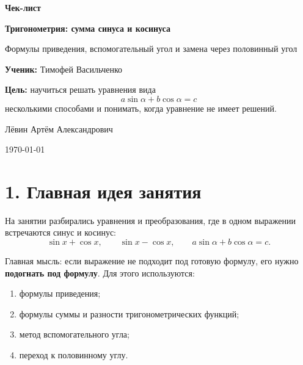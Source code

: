 \documentclass[a4paper,12pt]{article}
\newcommand{\important}[1]{\textcolor{darkaccent}{\textbf{#1}}}
\begin{document}
\begin{titlepage}
\thispagestyle{empty}

\vspace*{18mm}

{\Huge\bfseries\textcolor{darkaccent}{Чек-лист}}

\vspace{8mm}

{\Large\bfseries Тригонометрия: сумма синуса и косинуса}

\vspace{4mm}

{\large Формулы приведения, вспомогательный угол и замена через половинный угол}

\vspace{18mm}

\textbf{Ученик:} Тимофей Васильченко

\vspace{7mm}

\textbf{Цель:} научиться решать уравнения вида
\[
a\sin\alpha+b\cos\alpha=c
\]
несколькими способами и понимать, когда уравнение не имеет решений.

\vfill

{\large Лёвин Артём Александрович}

\vspace{4mm}

{\large \today}

\end{titlepage}

\section*{1. Главная идея занятия}

На занятии разбирались уравнения и преобразования, где в одном выражении встречаются синус и косинус:
\[
\sin x+\cos x,\qquad \sin x-\cos x,\qquad a\sin\alpha+b\cos\alpha=c.
\]

Главная мысль: если выражение не подходит под готовую формулу, его нужно \important{подогнать под формулу}. Для этого используются:

\begin{enumerate}[label=\textbf{\arabic*.}, leftmargin=8mm]
\item формулы приведения;
\item формулы суммы и разности тригонометрических функций;
\item метод вспомогательного угла;
\item переход к половинному углу.
\end{enumerate}
\end{document}
